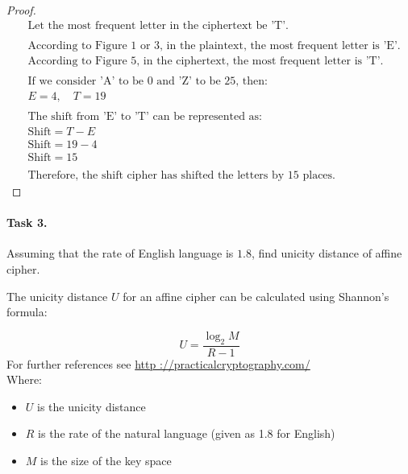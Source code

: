 \documentclass{article}
\begin{document}
\begin{enumerate}
\begin{minipage}{\linewidth}
\begin{proof}
\begin{align*}
              &\text{Let the most frequent letter in the ciphertext be 'T'.} \\
              & \\
              &\text{According to Figure 1 or 3, in the plaintext, the most frequent letter is 'E'.} \\
              &\text{According to Figure 5, in the ciphertext, the most frequent letter is 'T'.} \\
              & \\
              &\text{If we consider 'A' to be 0 and 'Z' to be 25, then:} \\
              &E = 4, \quad T = 19 \\
              & \\
              &\text{The shift from 'E' to 'T' can be represented as:} \\
              &\text{Shift} = T - E \\
              &\text{Shift} = 19 - 4 \\
              &\text{Shift} = 15 \\
              & \\
              &\text{Therefore, the shift cipher has shifted the letters by 15 places.}
            \end{align*}
          \end{proof}
    \end{minipage}
\end{enumerate}


\paragraph{Task 3.} Assuming that the rate of English language is $1.8$, find unicity distance of affine cipher.


The unicity distance \( U \) for an affine cipher can be calculated using Shannon's formula:

\[
  U = \frac{\log_2 M}{R - 1}
\]
For further references see \href{http://practicalcryptography.com/cryptanalysis/text-characterisation/statistics/#unicity-distance}{http
://practicalcryptography.com/}\\

Where:
\begin{itemize}
  \item \( U \) is the unicity distance
  \item \( R \) is the rate of the natural language (given as 1.8 for English)
  \item \( M \) is the size of the key space
\end{itemize}
\end{document}
